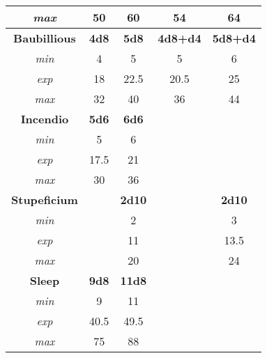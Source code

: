 \begin{tabular}{c|c|c|c|c}
	\textit{max}           &         50          &                60     &           54      &                  64      \\ \hline
	\textbf{Baubillious}   & \textbf{4d8}        & \textbf{5d8}          & \textbf{4d8+d4}   & \textbf{5d8+d4}          \\
	\textit{min}           &          4          &                 5     &            5      &     6                    \\
	\textit{exp}           &         18          &                22.5   &           20.5    &    25                    \\
	\textit{max}           &         32          &                40     &           36      &    44                    \\ \hline
	\textbf{Incendio}      & \textbf{5d6}        & \textbf{6d6}          &                   &                          \\
	\textit{min}           &          5          &                 6     &                   &                          \\
	\textit{exp}           &         17.5        &                21     &                   &                          \\
	\textit{max}           &         30          &                36     &                   &                          \\ \hline
	\textbf{Stupeficium}   &                     & \textbf{2d10}         &                   & \textbf{2d10}            \\
	\textit{min}           &                     &                    2  &                   &       3                  \\
	\textit{exp}           &                     &                   11  &                   &      13.5                \\
	\textit{max}           &                     &                   20  &                   &      24                  \\ \hline
	\textbf{Sleep}         & \textbf{9d8}        & \textbf{11d8}         &                   &                          \\
	\textit{min}           &          9          &                11     &                   &                          \\
	\textit{exp}           &         40.5        &                49.5   &                   &                          \\
	\textit{max}           &         75          &                88     &                   &                          \\ \hline
\end{tabular}

